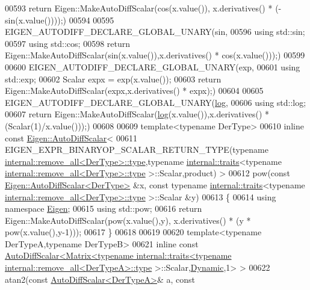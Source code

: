 \begin{DoxyCode}
00593   \textcolor{keywordflow}{return} Eigen::MakeAutoDiffScalar(cos(x.value()), x.derivatives() * (-sin(x.value())));)
00594 
00595 EIGEN\_AUTODIFF\_DECLARE\_GLOBAL\_UNARY(sin,
00596   \textcolor{keyword}{using} std::sin;
00597   \textcolor{keyword}{using} std::cos;
00598   \textcolor{keywordflow}{return} Eigen::MakeAutoDiffScalar(sin(x.value()),x.derivatives() * cos(x.value()));)
00599 
00600 EIGEN\_AUTODIFF\_DECLARE\_GLOBAL\_UNARY(exp,
00601   \textcolor{keyword}{using} std::exp;
00602   Scalar expx = exp(x.value());
00603   \textcolor{keywordflow}{return} Eigen::MakeAutoDiffScalar(expx,x.derivatives() * expx);)
00604 
00605 EIGEN\_AUTODIFF\_DECLARE\_GLOBAL\_UNARY(\hyperlink{structlog}{log},
00606   \textcolor{keyword}{using} std::log;
00607   \textcolor{keywordflow}{return} Eigen::MakeAutoDiffScalar(\hyperlink{structlog}{log}(x.value()),x.derivatives() * (Scalar(1)/x.value()));)
00608 
00609 template<typename DerType>
00610 \textcolor{keyword}{inline} \textcolor{keyword}{const} \hyperlink{class_eigen_1_1_auto_diff_scalar}{Eigen::AutoDiffScalar}<
00611 EIGEN\_EXPR\_BINARYOP\_SCALAR\_RETURN\_TYPE(\textcolor{keyword}{typename} 
      \hyperlink{group___sparse_core___module}{internal::remove\_all<DerType>::type},\textcolor{keyword}{typename} 
      \hyperlink{struct_eigen_1_1internal_1_1traits}{internal::traits}<\textcolor{keyword}{typename} \hyperlink{group___sparse_core___module}{internal::remove\_all<DerType>::type}
      >::Scalar,product) >
00612 pow(\textcolor{keyword}{const} \hyperlink{class_eigen_1_1_auto_diff_scalar}{Eigen::AutoDiffScalar<DerType>} &x, \textcolor{keyword}{const} \textcolor{keyword}{typename} 
      \hyperlink{struct_eigen_1_1internal_1_1traits}{internal::traits}<\textcolor{keyword}{typename} \hyperlink{group___sparse_core___module}{internal::remove\_all<DerType>::type}
      >::Scalar &y)
00613 \{
00614   \textcolor{keyword}{using namespace }\hyperlink{namespace_eigen}{Eigen};
00615   \textcolor{keyword}{using} std::pow;
00616   \textcolor{keywordflow}{return} Eigen::MakeAutoDiffScalar(pow(x.value(),y), x.derivatives() * (y * pow(x.value(),y-1)));
00617 \}
00618 
00619 
00620 \textcolor{keyword}{template}<\textcolor{keyword}{typename} DerTypeA,\textcolor{keyword}{typename} DerTypeB>
00621 \textcolor{keyword}{inline} \textcolor{keyword}{const} 
      \hyperlink{class_eigen_1_1_auto_diff_scalar}{AutoDiffScalar<Matrix<typename internal::traits<typename internal::remove\_all<DerTypeA>::type}
      >::Scalar,\hyperlink{namespace_eigen_ad81fa7195215a0ce30017dfac309f0b2}{Dynamic},1> >
00622 atan2(\textcolor{keyword}{const} \hyperlink{class_eigen_1_1_auto_diff_scalar}{AutoDiffScalar<DerTypeA>}& a, \textcolor{keyword}{const} 

\end{DoxyCode}
